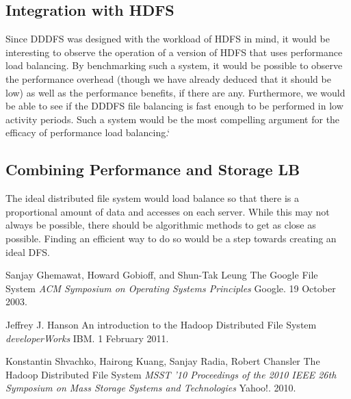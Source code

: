 \documentclass[twoside]{article}
\begin{document}
\begin{multicols}{2}
\subsection*{Integration with HDFS}
Since DDDFS was designed with the workload of HDFS in mind, it would be interesting to observe the operation of a version of HDFS that uses performance load balancing. By benchmarking such a system, it would be possible to observe the performance overhead (though we have already deduced that it should be low) as well as the performance benefits, if there are any. Furthermore, we would be able to see if the DDDFS file balancing is fast enough to be performed in low activity periods. Such a system would be the most compelling argument for the efficacy of performance load balancing.`	

\subsection*{Combining Performance and Storage LB}
The ideal distributed file system would load balance so that there is a proportional amount of data and accesses on each server. While this may not always be possible, there should be algorithmic methods to get as close as possible. Finding an efficient way to do so would be a step towards creating an ideal DFS. 

\begin{thebibliography}{99} %

 Sanjay Ghemawat, Howard Gobioff, and Shun-Tak Leung
\newblock The Google File System
\newblock \textit{ACM Symposium on Operating Systems Principles}
\newblock Google. 19 October 2003.

 Jeffrey J. Hanson
\newblock An introduction to the Hadoop Distributed File System
\newblock \textit{developerWorks}
\newblock IBM. 1 February 2011. 

 Konstantin Shvachko, Hairong Kuang, Sanjay Radia, Robert Chansler
\newblock The Hadoop Distributed File System
\newblock \textit{MSST '10 Proceedings of the 2010 IEEE 26th Symposium on Mass Storage Systems and Technologies}
\newblock Yahoo!. 2010.

\end{thebibliography}


\end{multicols}
\end{document}
